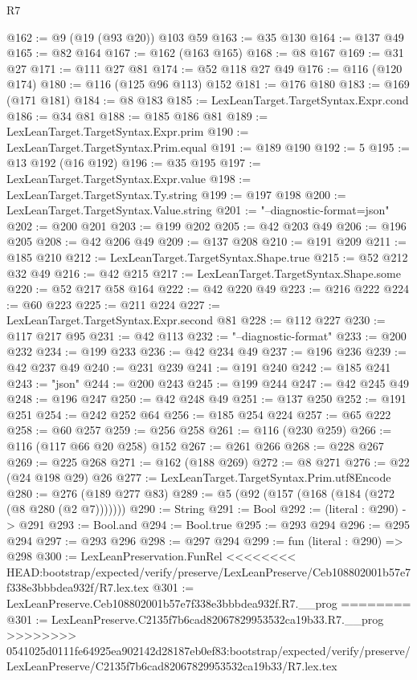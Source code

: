 \begin{lexlean}{R7}
\begin{coremodule}
{{{{{{{{{{{{{@162 := @9 (@19 (@93 @20)) @103 @59
@163 := @35 @130
@164 := @137 @49
@165 := @82 @164
@167 := @162 (@163 @165)
@168 := @8 @167
@169 := @31 @27
@171 := @111 @27 @81
@174 := @52 @118 @27 @49
@176 := @116 (@120 @174)
@180 := @116 (@125 @96 @113) @152
@181 := @176 @180
@183 := @169 (@171 @181)
@184 := @8 @183
@185 := LexLeanTarget.TargetSyntax.Expr.cond
@186 := @34 @81
@188 := @185 @186 @81
@189 := LexLeanTarget.TargetSyntax.Expr.prim
@190 := LexLeanTarget.TargetSyntax.Prim.equal
@191 := @189 @190
@192 := 5
@195 := @13 @192 (@16 @192)
@196 := @35 @195
@197 := LexLeanTarget.TargetSyntax.Expr.value
@198 := LexLeanTarget.TargetSyntax.Ty.string
@199 := @197 @198
@200 := LexLeanTarget.TargetSyntax.Value.string
@201 := "--diagnostic-format=json"
@202 := @200 @201
@203 := @199 @202
@205 := @42 @203 @49
@206 := @196 @205
@208 := @42 @206 @49
@209 := @137 @208
@210 := @191 @209
@211 := @185 @210
@212 := LexLeanTarget.TargetSyntax.Shape.true
@215 := @52 @212 @32 @49
@216 := @42 @215
@217 := LexLeanTarget.TargetSyntax.Shape.some
@220 := @52 @217 @58 @164
@222 := @42 @220 @49
@223 := @216 @222
@224 := @60 @223
@225 := @211 @224
@227 := LexLeanTarget.TargetSyntax.Expr.second @81
@228 := @112 @227
@230 := @117 @217 @95
@231 := @42 @113
@232 := "--diagnostic-format"
@233 := @200 @232
@234 := @199 @233
@236 := @42 @234 @49
@237 := @196 @236
@239 := @42 @237 @49
@240 := @231 @239
@241 := @191 @240
@242 := @185 @241
@243 := "json"
@244 := @200 @243
@245 := @199 @244
@247 := @42 @245 @49
@248 := @196 @247
@250 := @42 @248 @49
@251 := @137 @250
@252 := @191 @251
@254 := @242 @252 @64
@256 := @185 @254 @224
@257 := @65 @222
@258 := @60 @257
@259 := @256 @258
@261 := @116 (@230 @259)
@266 := @116 (@117 @66 @20 @258) @152
@267 := @261 @266
@268 := @228 @267
@269 := @225 @268
@271 := @162 (@188 @269)
@272 := @8 @271
@276 := @22 (@24 @198 @29) @26
@277 := LexLeanTarget.TargetSyntax.Prim.utf8Encode
@280 := @276 (@189 @277 @83)
@289 := @5 (@92 (@157 (@168 (@184 (@272 (@8 @280 (@2 @7)))))))
@290 := String
@291 := Bool
@292 := (literal : @290) -> @291
@293 := Bool.and
@294 := Bool.true
@295 := @293 @294
@296 := @295 @294
@297 := @293 @296
@298 := @297 @294
@299 := fun (literal : @290) => @298
@300 := LexLeanPreservation.FunRel
<<<<<<<< HEAD:bootstrap/expected/verify/preserve/LexLeanPreserve/Ceb108802001b57e7f338e3bbbdea932f/R7.lex.tex
@301 := LexLeanPreserve.Ceb108802001b57e7f338e3bbbdea932f.R7.__prog
========
@301 := LexLeanPreserve.C2135f7b6cad82067829953532ca19b33.R7.__prog
>>>>>>>> 0541025d0111fe64925ea902142d28187eb0ef83:bootstrap/expected/verify/preserve/LexLeanPreserve/C2135f7b6cad82067829953532ca19b33/R7.lex.tex
}}}}}}}}}}}}}
\end{coremodule}
\end{lexlean}
